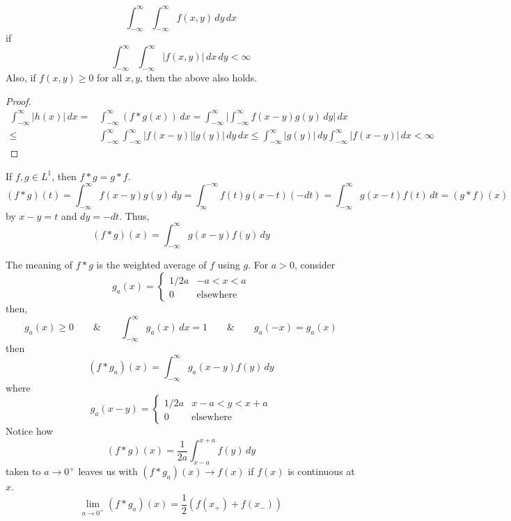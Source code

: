 \vspace{2ex}
\begin{lem}
\[\int ^{\infty }_{-\infty }\int ^{\infty }_{-\infty }f(x,y)\,dy\,dx\]
if 
\[\int ^{\infty }_{-\infty }\int ^{\infty }_{-\infty }|f(x,y)|\,dx\,dy<\infty \]
Also, if $f(x,y)\geq 0$ for all $x,y$, then the above also holds.
\end{lem}
\vspace{2ex}
\begin{proof}
\[\begin{align*}
\int ^{\infty }_{-\infty }|h(x)|\,dx=&\int ^{\infty }_{-\infty }(f\ast g(x))\,dx=\int ^{\infty }_{-\infty }\Big|\int ^{\infty }_{-\infty }f(x-y)g(y)\,dy\Big|\,dx\\
\leq& \int ^{\infty }_{-\infty }\int ^{\infty }_{-\infty }|f(x-y)||g(y)|\,dy\,dx\leq \int ^{\infty }_{-\infty }|g(y)|\,dy\int ^{\infty }_{-\infty }|f(x-y)|\,dx<\infty 
\end{align*}\]
\end{proof}
\vspace{2ex}
\begin{thm}
If $f,g\in L^{1}$, then $f\ast g=g\ast f$. 
\[(f\ast g)(t)=\int ^{\infty }_{-\infty }f(x-y)g(y)\,dy=\int ^{-\infty }_{\infty }f(t)g(x-t)(-dt)=\int ^{\infty }_{-\infty }g(x-t)f(t)\,dt=(g\ast f)(x)\]
by $x-y=t$ and $dy=-dt$. Thus,
\[(f\ast g)(x)=\int ^{\infty }_{-\infty }g(x-y)f(y)\,dy\]
\end{thm}
\vspace{2ex}
\begin{rmk}
The meaning of $f\ast g$ is the weighted average of $f$ using $g$. For $a>0$, consider 
\[g_{a}(x)=\begin{cases}
1/2a& -a<x<a\\
0&\mathrm{elsewhere}
\end{cases}\]
then,
\[g_{a}(x)\geq 0\qquad\&\qquad \int ^{\infty }_{-\infty }g_{a}(x)\,dx=1\qquad\&\qquad g_{a}(-x)=g_{a}(x)\]
then
\[(f\ast g_{a})(x)=\int ^{\infty }_{-\infty }g_{a}(x-y)f(y)\,dy\]
where
\[g_{a}(x-y)=\begin{cases}
1/2a&x-a<y<x+a\\
0&\mathrm{elsewhere}
\end{cases}\]
Notice how
\[(f\ast g)(x)=\dfrac{1}{2a}\int ^{x+a}_{x-a}f(y)\,dy\]
taken to $a\rightarrow 0^{+}$ leaves us with $(f\ast g_{a})(x)\rightarrow f(x)$ if $f(x)$ is continuous at $x$.
\[\lim _{a\rightarrow 0^{+}}(f\ast g_{a})(x)=\dfrac{1}{2}(f(x_{+})+f(x_{-}))\]
\end{rmk}
\vspace{2ex}
